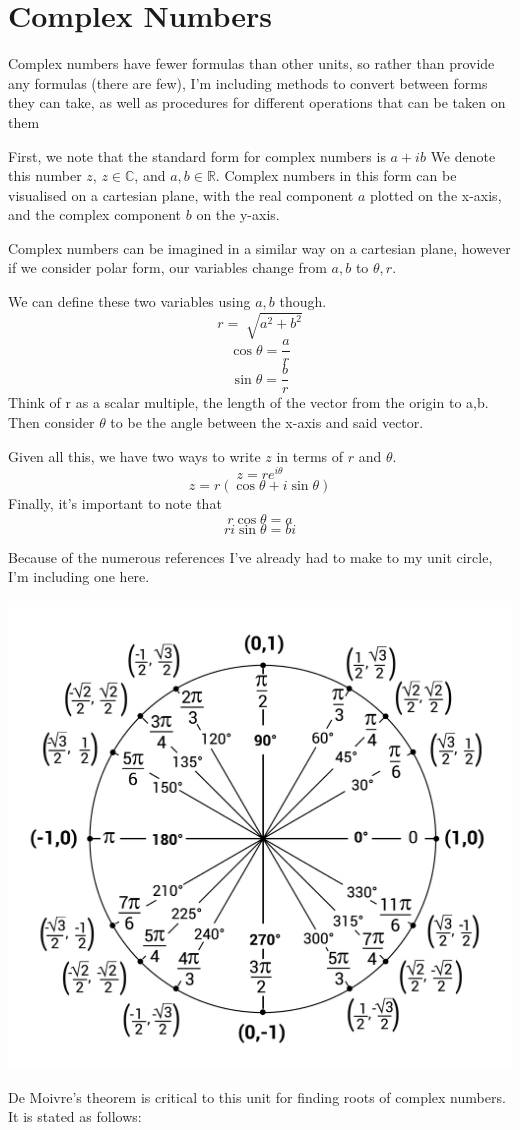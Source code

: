 \documentclass{article}
\begin{document}
\section{Complex Numbers}
Complex numbers have fewer formulas than other units, so rather than provide 
any formulas (there are few), I'm including methods to convert between forms
they can take, as well as procedures for different operations that can be 
taken on them\par 
First, we note that the standard form for complex numbers is $a+ib$
We denote this number $z$, $z \in \mathbb{C}$, and $a,b \in \mathbb{R}$.
Complex numbers in this form can be visualised on a cartesian plane,
with the real component $a$ plotted on the x-axis, and the 
complex component $b$ on the y-axis.
\newpage
\par 
Complex numbers can be imagined in a similar way on a cartesian plane,
however if we consider polar form, our variables change from 
$a,b$ to $\theta,r$.
\par
We can define these two variables using $a,b$ though. 
\[r = \sqrt[]{a^2+b^2}\]
\[\cos{\theta} = \frac{a}{r}\]
\[\sin{\theta} = \frac{b}{r}\]
Think of r as a scalar multiple, the length of the vector
from the origin to a,b. Then consider $\theta$ to be the 
angle between the x-axis and said vector.
\par 
Given all this, we have two ways to write $z$ in terms of 
$r$ and $\theta$. 
\[z = r e^{i \theta}\]
\[z = r(\cos{\theta}+i\sin{\theta})\]
Finally, it's important to note that 
\[r\cos{\theta} = a\]
\[ri\sin{\theta}= bi\]
\begin{center}
Because of the numerous references I've already had to make to my unit
circle, I'm including one here.\par 
\includegraphics[scale=0.125]{Unit-circle}
\end{center}
De Moivre's theorem is critical to this unit for finding roots of complex numbers.
It is stated as follows:
\end{document}
